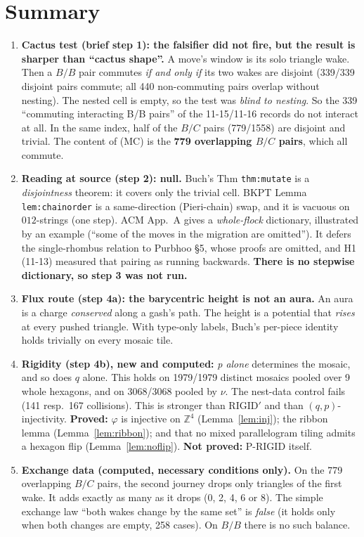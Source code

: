 \documentclass[11pt]{article}
\theoremstyle{definition}
\begin{document}
\section*{Summary}
\begin{enumerate}
\item \textbf{Cactus test (brief step 1): the falsifier did not fire, but the result is sharper than ``cactus shape''.} A move's window
is its solo triangle wake. Then a $B/B$ pair commutes \emph{if and only if} its two wakes are disjoint (339/339 disjoint pairs commute;
all 440 non-commuting pairs overlap without nesting). The nested cell is empty, so the test was \emph{blind to nesting}. So the 339
``commuting interacting B/B pairs'' of the 11-15/11-16 records do not interact at all. In the same index, half of the $B/C$ pairs (779/1558)
are disjoint and trivial. The content of (MC) is the \textbf{779 overlapping $B/C$ pairs}, which all commute.
\item \textbf{Reading at source (step 2): null.} Buch's Thm \texttt{thm:mutate} is a \emph{disjointness} theorem: it covers only the trivial cell.
BKPT Lemma \texttt{lem:chainorder} is a same-direction (Pieri-chain) swap, and it is vacuous on $012$-strings (one step). ACM App.~A gives a
\emph{whole-flock} dictionary, illustrated by an example (``some of the moves in the migration are omitted''). It defers the single-rhombus
relation to Purbhoo \S5, whose proofs are omitted, and H1 (11-13) measured that pairing as running backwards. \textbf{There is no stepwise
dictionary, so step 3 was not run.}
\item \textbf{Flux route (step 4a): the barycentric height is not an aura.} An aura is a charge \emph{conserved} along a gash's path. The
height is a potential that \emph{rises} at every pushed triangle. With type-only labels, Buch's per-piece identity holds trivially on every
mosaic tile.
\item \textbf{Rigidity (step 4b), new and computed:} \emph{p alone} determines the mosaic, and so does $q$ alone. This holds on 1979/1979
distinct mosaics pooled over 9 whole hexagons, and on 3068/3068 pooled by $\nu$. The nest-data control fails (141 resp.\ 167 collisions). This
is stronger than RIGID$'$ and than $(q,p)$-injectivity. \textbf{Proved:} $\varphi$ is injective on $\mathbb Z^4$ (Lemma~\ref{lem:inj}); the ribbon
lemma (Lemma~\ref{lem:ribbon}); and that no mixed parallelogram tiling admits a hexagon flip (Lemma~\ref{lem:noflip}). \textbf{Not proved:} P-RIGID itself.
\item \textbf{Exchange data (computed, necessary conditions only).} On the 779 overlapping $B/C$ pairs, the second journey drops only
triangles of the first wake. It adds exactly as many as it drops (0, 2, 4, 6 or 8). The simple exchange law ``both wakes change by the same set''
is \emph{false} (it holds only when both changes are empty, 258 cases). On $B/B$ there is no such balance.
\end{enumerate}
\end{document}
